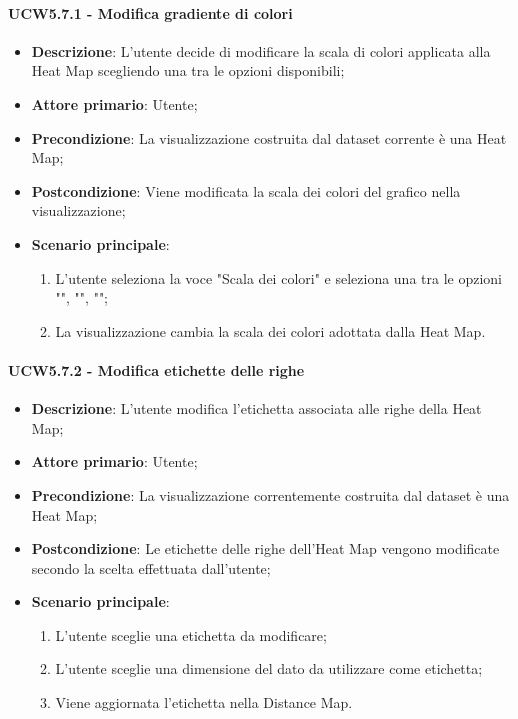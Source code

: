 \paragraph{UCW5.7.1 - Modifica gradiente di colori}
\label{par:ucw5.7.1}
\begin{itemize}
    \item \textbf{Descrizione}: L'utente decide di modificare la scala di colori applicata alla Heat Map scegliendo una tra le opzioni disponibili;

    \item \textbf{Attore primario}: Utente;

    \item \textbf{Precondizione}:   La visualizzazione costruita dal dataset corrente è una Heat Map;
    \item \textbf{Postcondizione}:  Viene modificata la scala dei colori del grafico nella visualizzazione;

	\item \textbf{Scenario principale}:
        \begin{enumerate}
            \item L'utente seleziona la voce "Scala dei colori" e seleziona una tra le opzioni  "", "", "";
            \item La visualizzazione cambia la scala dei colori adottata dalla Heat Map.
        \end{enumerate}
\end{itemize}

\paragraph{UCW5.7.2 - Modifica etichette delle righe}
\label{par:ucw5.7.2}
\begin{itemize}
    \item \textbf{Descrizione}:     L'utente modifica l'etichetta associata alle righe della Heat Map;
    \item \textbf{Attore primario}: Utente;
    \item \textbf{Precondizione}:   La visualizzazione correntemente costruita dal dataset è una Heat Map;
    \item \textbf{Postcondizione}:  Le etichette delle righe dell'Heat Map vengono modificate secondo la scelta effettuata dall'utente;
    \item \textbf{Scenario principale}:
    \begin{enumerate}
        \item L'utente sceglie una etichetta da modificare;
        \item L'utente sceglie una dimensione del dato da utilizzare come etichetta;
        \item Viene aggiornata l'etichetta nella Distance Map.
    \end{enumerate}
\end{itemize}

